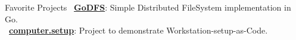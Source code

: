 \documentclass{resume}
\begin{document}
    \begin{rSection}{Favorite Projects}
    \textbullet\ \textbf{\href{https://github.com/rounakdatta/GoDFS}{GoDFS}}: Simple Distributed FileSystem implementation in Go.\\
    \textbullet\ \textbf{\href{https://github.com/rounakdatta/computer.setup}{computer.setup}}: Project to demonstrate Workstation-setup-as-Code.
  \end{rSection}
\end{document}
